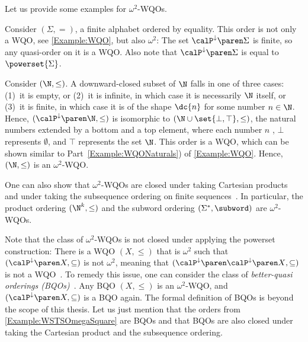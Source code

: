 \documentclass[../../diss.tex]{subfiles}
\begin{document}
Let us provide some examples for $\omega^2$-WQOs.

\begin{example}%
\label{Example:WSTSOmegaSquare}%
    \begin{thmenumerate}[a)]
        \item
            Consider $(\Sigma,=)$, a finite alphabet ordered by equality.
            This order is not only a WQO, see \cref{Example:WQO}, but also $\omega^2$:
            The set $\pwrsetdown{\Sigma}$ is finite, so any quasi-order on it is a WQO.\@
            Also note that $\pwrsetdown{\Sigma}$ is equal to $\powerset{\Sigma}$.
        \item
            Consider $(\N,\leq)$.
            A downward-closed subset of $\N$ falls in one of three cases:
            (1)~it is empty, or
            (2)~it is infinite, in which case it is necessarily $\N$ itself, or
            (3)~it is finite, in which case it is of the shape $\dc{n}$ for some number $n \in \N$.
            Hence, $(\pwrsetdown{\N},\leq)$ is isomorphic to $(\N \cup \set{\bot,\top},\leq)$, the natural numbers extended by a bottom and a top element, where each number $n$ , $\bot$ represents $\emptyset$, and $\top$ represents the set $\N$.
            This order is a WQO, which can be shown similar to Part~\ref{Example:WQONaturals}) of \cref{Example:WQO}.
            Hence, $(\N,\leq)$ is an $\omega^2$-WQO.\@
    \end{thmenumerate}
\end{example}

One can also show that $\omega^2$-WQOs are closed under taking Cartesian products and under taking the subsequence ordering on finite sequences~\cite{FinkelG09,FinkelG12}.
In particular, the product ordering $(\N^k,\leq)$ and the subword ordering $(\Sigma^*,\subword)$ are $\omega^2$-WQOs.

Note that the class of $\omega^2$-WQOs is not closed under applying the powerset construction:
There is a WQO $(X,\leq)$ that is $\omega^2$ such that $(\pwrsetdown{X},\subseteq)$ is not $\omega^2$, meaning that $(\pwrsetdown{\pwrsetdown{X}},\subseteq)$ is not a WQO~\cite{Jancar99}.
To remedy this issue, one can consider the class of \emph{better-quasi orderings (BQOs)}~\cite{NashWilliams68}.
Any BQO $(X,\leq)$ is an $\omega^2$-WQO, and $(\pwrsetdown{X},\subseteq)$ is a BQO again.
The formal definition of BQOs is beyond the scope of this thesis.
Let us just mention that the orders from \cref{Example:WSTSOmegaSquare} are BQOs and that BQOs are also closed under taking the Cartesian product and the subsequence ordering.
\end{document}
